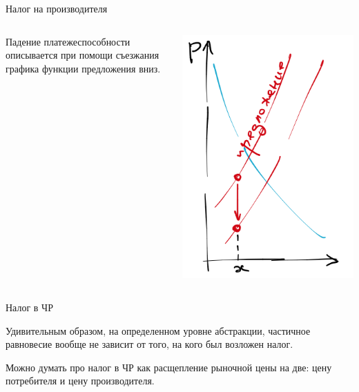 \documentclass{beamer}
\begin{document}
\begin{frame}{Налог на производителя}
\begin{columns}
\begin{column}{0.5\textwidth}
   Падение платежеспособности описывается при помощи съезжания графика функции предложения вниз.
\end{column}
\begin{column}{0.5\textwidth}  %
    \begin{center}
     \includegraphics[width=1\textwidth]{prodtax}
     \end{center}
\end{column}
\end{columns}
\end{frame}

\begin{frame}{Налог в ЧР}

Удивительным образом, на определенном уровне абстракции, частичное равновесие вообще не зависит от того, на кого был возложен налог.

\alert{Можно думать про налог в ЧР как расщепление рыночной цены на две: цену потребителя и цену производителя.}

\end{frame}
\end{document}
